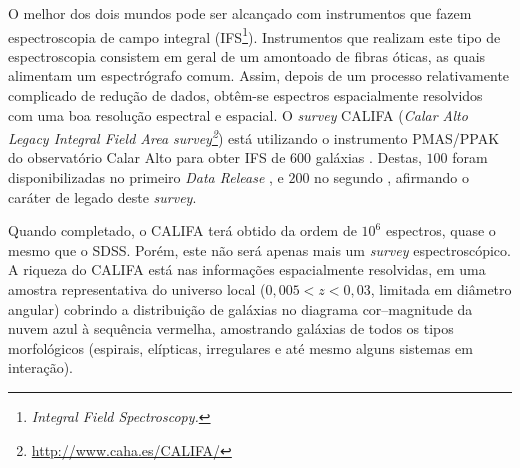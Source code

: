 
O melhor dos dois mundos pode ser alcançado com instrumentos que fazem
espectroscopia de campo integral (IFS\footnote{\em Integral Field
Spectroscopy.}). Instrumentos que realizam este tipo de espectroscopia consistem
em geral de um amontoado de fibras óticas, as quais alimentam um espectrógrafo
comum. Assim, depois de um processo relativamente complicado de redução de
dados, obtêm-se espectros espacialmente resolvidos com uma boa resolução
espectral e espacial. O {\em survey} CALIFA ({\em Calar Alto Legacy Integral
Field Area survey\footnote{\url{http://www.caha.es/CALIFA/}}}) está utilizando o
instrumento PMAS/PPAK do observatório Calar Alto para obter IFS de $600$
galáxias \citep{Sanchez2012}. Destas, $100$ foram disponibilizadas no primeiro
{\em Data Release} \citep[DR1]{Husemann2013}, e $200$ no segundo
\citep{GarciaBenito2015}, afirmando o caráter de legado deste {\em survey}.

Quando completado, o CALIFA terá obtido da ordem de $10^6$ espectros, quase o
mesmo que o SDSS. Porém, este não será apenas mais um {\em survey}
espectroscópico. A riqueza do CALIFA está nas informações espacialmente
resolvidas, em uma amostra representativa do universo local ($0,005 < z < 0,03$,
limitada em diâmetro angular) cobrindo a distribuição de galáxias no diagrama
cor--magnitude da nuvem azul à sequência vermelha, amostrando galáxias de todos
os tipos morfológicos (espirais, elípticas, irregulares e até mesmo alguns
sistemas em interação).

